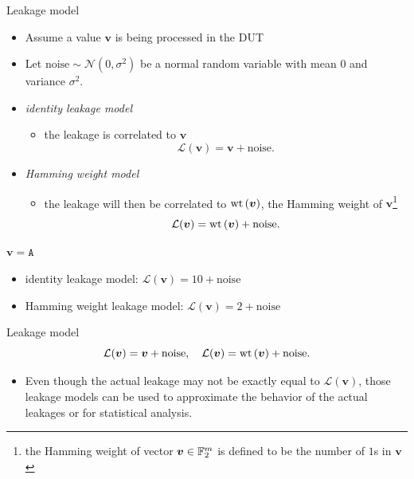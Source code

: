 \begin{frame}{Leakage model}
    \begin{itemize}
        \item Assume a value $\boldsymbol{v}$ is being processed in the DUT
        \item Let $\text{noise}\sim\mathcal{N}(0,\sigma^2)$ be a normal random variable with mean $0$ and variance $\sigma^2$.
        \item \textit{identity leakage model}
        \begin{itemize}
            \item the leakage is correlated to $\boldsymbol{v}$
           \[
\mathcal{L}(\boldsymbol{v})=\boldsymbol{v}+\text{noise}.
\]
        \end{itemize}
        \item \textit{Hamming weight model}
        \begin{itemize}
            \item the leakage will then be correlated to $\textrm{wt}\left(\boldsymbol{v}\right)$, the Hamming weight of $\boldsymbol{v}$\footnote{the Hamming weight of vector $\boldsymbol{v}\in{\mathbb F}_2^m$ is defined to be the number of $1$s in $\boldsymbol{v}$}
            \[
            \mathcal{L}(\boldsymbol{v})=\textrm{wt}\left(\boldsymbol{v}\right)+\text{noise}.
            \]
        \end{itemize}
    \end{itemize}
        \begin{example}
    $\boldsymbol{v}=\texttt{A}$
    \begin{itemize}
        \item identity leakage model: $\mathcal{L}(\boldsymbol{v})=10+\text{noise}$
        \item Hamming weight leakage model: $\mathcal{L}(\boldsymbol{v})=2+\text{noise}$
    \end{itemize}
    \end{example}
\end{frame}

\begin{frame}{Leakage model}
\[
\mathcal{L}(\boldsymbol{v})=\boldsymbol{v}+\text{noise},\quad
  \mathcal{L}(\boldsymbol{v})=\textrm{wt}\left(\boldsymbol{v}\right)+\text{noise}.
\]
    \begin{itemize}
        \item Even though the actual leakage may not be exactly equal to $\mathcal{L}(\boldsymbol{v})$, those leakage models can be used to approximate the behavior of the actual leakages or for statistical analysis.
    \end{itemize}
\end{frame}